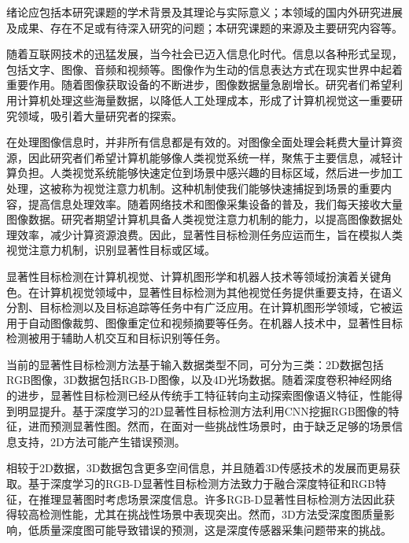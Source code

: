 绪论应包括本研究课题的学术背景及其理论与实际意义；本领域的国内外研究进展及成果、存在不足或有待深入研究的问题；本研究课题的来源及主要研究内容等。
\label{chap:part1}

随着互联网技术的迅猛发展，当今社会已迈入信息化时代。信息以各种形式呈现，包括文字、图像、音频和视频等。图像作为生动的信息表达方式在现实世界中起着重要作用。随着图像获取设备的不断进步，图像数据量急剧增长。研究者们希望利用计算机处理这些海量数据，以降低人工处理成本，形成了计算机视觉这一重要研究领域，吸引着大量研究者的探索。

在处理图像信息时，并非所有信息都是有效的。对图像全面处理会耗费大量计算资源，因此研究者们希望计算机能够像人类视觉系统一样，聚焦于主要信息，减轻计算负担。人类视觉系统能够快速定位到场景中感兴趣的目标区域，然后进一步加工处理，这被称为视觉注意力机制。这种机制使我们能够快速捕捉到场景的重要内容，提高信息处理效率。随着网络技术和图像采集设备的普及，我们每天接收大量图像数据。研究者期望计算机具备人类视觉注意力机制的能力，以提高图像数据处理效率，减少计算资源浪费。因此，显著性目标检测任务应运而生，旨在模拟人类视觉注意力机制，识别显著性目标或区域。


显著性目标检测在计算机视觉、计算机图形学和机器人技术等领域扮演着关键角色。在计算机视觉领域中，显著性目标检测为其他视觉任务提供重要支持，在语义分割、目标检测以及目标追踪等任务中有广泛应用。在计算机图形学领域，它被运用于自动图像裁剪、图像重定位和视频摘要等任务。在机器人技术中，显著性目标检测被用于辅助人机交互和目标识别等任务。

当前的显著性目标检测方法基于输入数据类型不同，可分为三类：2D数据包括RGB图像，3D数据包括RGB-D图像，以及4D光场数据。随着深度卷积神经网络的进步，显著性目标检测已经从传统手工特征转向主动探索图像语义特征，性能得到明显提升。基于深度学习的2D显著性目标检测方法利用CNN挖掘RGB图像的特征，进而预测显著性图。然而，在面对一些挑战性场景时，由于缺乏足够的场景信息支持，2D方法可能产生错误预测。

相较于2D数据，3D数据包含更多空间信息，并且随着3D传感技术的发展而更易获取。基于深度学习的RGB-D显著性目标检测方法致力于融合深度特征和RGB特征，在推理显著图时考虑场景深度信息。许多RGB-D显著性目标检测方法因此获得较高检测性能，尤其在挑战性场景中表现突出。然而，3D方法受深度图质量影响，低质量深度图可能导致错误的预测，这是深度传感器采集问题带来的挑战。

